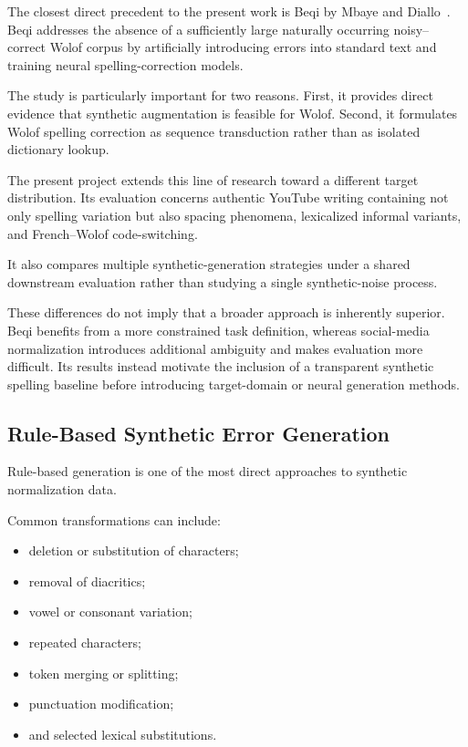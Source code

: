 \documentclass[12pt, a4paper, twoside, openany]{report}
\begin{document}
The closest direct precedent to the present work is Beqi by Mbaye and Diallo~\cite{mbaye2025beqi}. Beqi addresses the absence of a sufficiently large naturally occurring noisy--correct Wolof corpus by artificially introducing errors into standard text and training neural spelling-correction models.

The study is particularly important for two reasons. First, it provides direct evidence that synthetic augmentation is feasible for Wolof. Second, it formulates Wolof spelling correction as sequence transduction rather than as isolated dictionary lookup.

The present project extends this line of research toward a different target distribution. Its evaluation concerns authentic YouTube writing containing not only spelling variation but also spacing phenomena, lexicalized informal variants, and French--Wolof code-switching.

It also compares multiple synthetic-generation strategies under a shared downstream evaluation rather than studying a single synthetic-noise process.

These differences do not imply that a broader approach is inherently superior. Beqi benefits from a more constrained task definition, whereas social-media normalization introduces additional ambiguity and makes evaluation more difficult. Its results instead motivate the inclusion of a transparent synthetic spelling baseline before introducing target-domain or neural generation methods.


\subsection{Rule-Based Synthetic Error Generation}

Rule-based generation is one of the most direct approaches to synthetic normalization data.

Common transformations can include:

\begin{itemize}
	\item deletion or substitution of characters;
	\item removal of diacritics;
	\item vowel or consonant variation;
	\item repeated characters;
	\item token merging or splitting;
	\item punctuation modification;
	\item and selected lexical substitutions.
\end{itemize}
\end{document}
